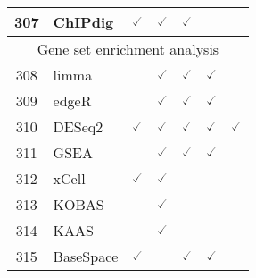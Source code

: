 \documentclass[10pt,letterpaper]{article}
\begin{document}
\begin{table}[!ht]
\begin{adjustwidth}{-2.25in}{0in}
\begin{tabular}{|c|l|c|c|c|c|c|}
307 & ChIPdig\cite{esse2017chipdig} & $\checked$ & $\checked$ & $\checked$ & & \\ \hline
\hline
\multicolumn{7}{|c|}{Gene set enrichment analysis} \\ \hline
\hline
308 & limma\cite{smyth2005use} & & $\checked$ & $\checked$ & $\checked$ & \\ 
309 & edgeR\cite{robinson2010edger} & & $\checked$ & $\checked$ & $\checked$ & \\ 
310 & DESeq2\cite{love2014moderated} & $\checked$ & $\checked$ & $\checked$ & $\checked$ & $\checked$  \\ 
311 & GSEA\cite{subramanian2005gene} & & $\checked$ & $\checked$ & $\checked$ & \\ 
312 & xCell\cite{aran2017xcell} & $\checked$ & $\checked$ & & & \\
313 & KOBAS\cite{wu2006kobas} & & $\checked$ & & & \\ 
314 & KAAS\cite{moriya2007kaas} & & $\checked$ & & & \\ 
315 & BaseSpace\cite{liu2014cushaw3} & $\checked$ & & $\checked$ & $\checked$ & \\ \hline
\end{tabular}
\label{table1}
\end{adjustwidth}
\end{table}
\end{document}
